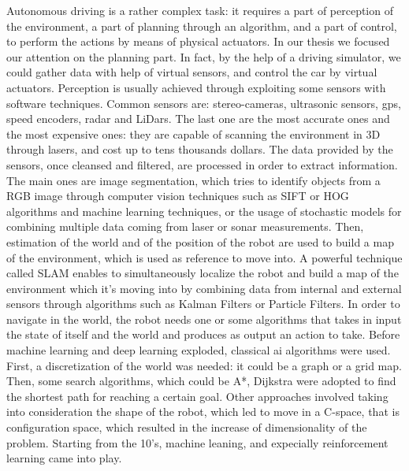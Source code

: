 Autonomous driving is a rather complex task: it requires a part of perception of the environment, a part of planning through an algorithm, and a part of control, to perform the actions by means of physical actuators. In our thesis we focused our attention on the planning part. In fact, by the help of a driving simulator, we could gather data with help of virtual sensors, and control the car by virtual actuators.
Perception is usually achieved through exploiting some sensors with software techniques.
Common sensors are: stereo-cameras, ultrasonic sensors, gps, speed encoders, radar and LiDars. The last one are the most accurate ones and the most expensive ones: they are capable of scanning the environment in 3D through lasers, and cost up to tens thousands dollars.
The data provided by the sensors, once cleansed and filtered, are processed in order to extract information. The main ones are image segmentation, which tries to identify objects from a RGB image through computer vision techniques such as SIFT or HOG algorithms and machine learning techniques, or the usage of stochastic models for combining multiple data coming from laser or sonar measurements.
Then, estimation of the world and of the position of the robot are used to build a map of the environment, which is used as reference to move into.
A powerful technique called SLAM enables to simultaneously localize the robot and build a map of the environment which it's moving into by combining data from internal and external sensors through algorithms such as Kalman Filters or Particle Filters.
In order to navigate in the world, the robot needs one or some algorithms that takes in input the state of itself and the world and produces as output an action to take.
Before machine learning and deep learning exploded, classical ai algorithms were used.
First, a discretization of the world was needed: it could be a graph or a grid map. Then, some search algorithms, which could be A*, Dijkstra were adopted to find the shortest path for reaching a certain goal.
Other approaches involved taking into consideration the shape of the robot, which led to move in a C-space, that is configuration space, which resulted in the increase of dimensionality of the problem.
Starting from the 10's, machine leaning, and expecially reinforcement learning came into play.
	
